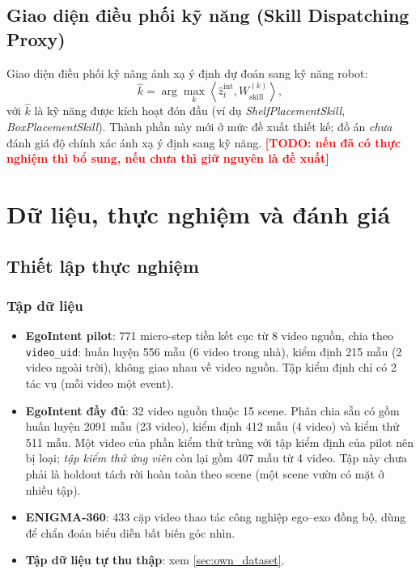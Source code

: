 \documentclass[12pt,a4paper]{report}
\newcommand{\TODO}[1]{\textcolor{red}{\textbf{[TODO: #1]}}}
\begin{document}
\section{Giao diện điều phối kỹ năng (Skill Dispatching Proxy)}

Giao diện điều phối kỹ năng ánh xạ ý định dự đoán sang kỹ năng robot:
\begin{equation}
    \hat{k} = \arg\max_{k} \left\langle \hat{z}_t^{\mathrm{int}}, W_{\mathrm{skill}}^{(k)} \right\rangle,
\end{equation}
với $\hat{k}$ là kỹ năng được kích hoạt đón đầu (ví dụ \textit{ShelfPlacementSkill}, \textit{BoxPlacementSkill}). Thành phần này mới ở mức đề xuất thiết kế; đồ án \emph{chưa} đánh giá độ chính xác ánh xạ ý định sang kỹ năng. \TODO{nếu đã có thực nghiệm thì bổ sung, nếu chưa thì giữ nguyên là đề xuất}

\chapter{Dữ liệu, thực nghiệm và đánh giá}
\label{chap:experiments}

\section{Thiết lập thực nghiệm}

\subsection{Tập dữ liệu}
\begin{itemize}
    \item \textbf{EgoIntent pilot}: 771 micro-step tiền kết cục từ 8 video nguồn, chia theo \texttt{video\_uid}: huấn luyện 556 mẫu (6 video trong nhà), kiểm định 215 mẫu (2 video ngoài trời), không giao nhau về video nguồn. Tập kiểm định chỉ có 2 tác vụ (mỗi video một event).
    \item \textbf{EgoIntent đầy đủ}: 32 video nguồn thuộc 15 scene. Phân chia sẵn có gồm huấn luyện 2091 mẫu (23 video), kiểm định 412 mẫu (4 video) và kiểm thử 511 mẫu. Một video của phần kiểm thử trùng với tập kiểm định của pilot nên bị loại; \emph{tập kiểm thử ứng viên} còn lại gồm 407 mẫu từ 4 video. Tập này chưa phải là holdout tách rời hoàn toàn theo scene (một scene vườn có mặt ở nhiều tập).
    \item \textbf{ENIGMA-360}: 433 cặp video thao tác công nghiệp ego--exo đồng bộ, dùng để chẩn đoán biểu diễn bất biến góc nhìn.
    \item \textbf{Tập dữ liệu tự thu thập}: xem \cref{sec:own_dataset}.
\end{itemize}
\end{document}
